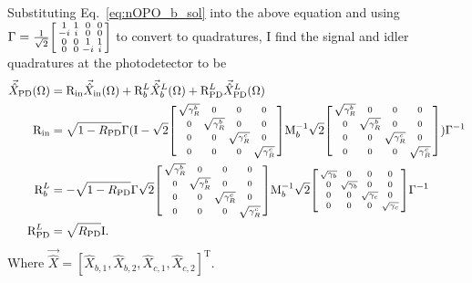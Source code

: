 Substituting Eq.~\ref{eq:nOPO_b_sol} into the above equation and using $\Gamma=\frac{1}{\sqrt2}\begin{bsmallmatrix}
1 & 1 & 0 & 0 \\
-i & i & 0 & 0 \\
0 & 0 & 1 & 1 \\
0 & 0 & -i & i
\end{bsmallmatrix}$ to convert to quadratures, I find the signal and idler quadratures at the photodetector to be~\cite{}
\begin{align}
\vec{\hat X}_\mathrm{PD}(\Omega)&=\text{R}_\text{in}\vec{\hat X}_\mathrm{in}(\Omega)+\text{R}^L_b\vec{\hat X}^L_b(\Omega)+\text{R}^L_\text{PD}\vec{\hat X}^L_\text{PD}(\Omega)\\
\text{R}_\text{in}&=\sqrt{1-R_\text{PD}}\Gamma(\text{I}-\sqrt 2\begin{bsmallmatrix}
\sqrt{\gamma^b_R} & 0 & 0 & 0 \\
0 & \sqrt{\gamma^b_R} & 0 & 0 \\
0 & 0 & \sqrt{\gamma^c_R} & 0 \\
0 & 0 & 0 & \sqrt{\gamma^c_R}
\end{bsmallmatrix}\text{M}_b^{-1}\sqrt{2}\begin{bsmallmatrix}
\sqrt{\gamma^b_R} & 0 & 0 & 0 \\
0 & \sqrt{\gamma^b_R} & 0 & 0 \\
0 & 0 & \sqrt{\gamma^c_R} & 0 \\
0 & 0 & 0 & \sqrt{\gamma^c_R}
\end{bsmallmatrix})\Gamma^{-1}\\
\text{R}^L_b&=-\sqrt{1-R_\text{PD}}\Gamma\sqrt 2\begin{bsmallmatrix}
\sqrt{\gamma^b_R} & 0 & 0 & 0 \\
0 & \sqrt{\gamma^b_R} & 0 & 0 \\
0 & 0 & \sqrt{\gamma^c_R} & 0 \\
0 & 0 & 0 & \sqrt{\gamma^c_R}
\end{bsmallmatrix}\text{M}_b^{-1}\sqrt{2}\begin{bsmallmatrix}
\sqrt{\gamma_b} & 0 & 0 & 0 \\
0 & \sqrt{\gamma_b} & 0 & 0 \\
0 & 0 & \sqrt{\gamma_c} & 0 \\
0 & 0 & 0 & \sqrt{\gamma_c}
\end{bsmallmatrix}\Gamma^{-1}\\
\text{R}^L_\text{PD}&=\sqrt{R_\text{PD}} \text{I}.
\end{align}
Where $\vec{\hat X}=[\hat X_{b,1},\hat X_{b,2},\hat X_{c,1},\hat X_{c,2}]^\text{T}$. %

